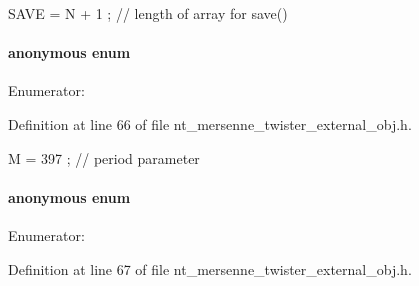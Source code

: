 \begin{DoxyCode}
{ SAVE = N + 1 };         // length of array for save()
\end{DoxyCode}


\paragraph[{"@2}]{\setlength{\rightskip}{0pt plus 5cm}anonymous enum}\hfill\label{class_m_t_rand_a10c3437be98225f5b0beee1ed8c033c8}
\begin{Desc}
\item[Enumerator: ]\par
\begin{description}
\item[{\em 
M\label{class_m_t_rand_a10c3437be98225f5b0beee1ed8c033c8a133070000b798889cd75535ea0d5bb71}
}]\end{description}
\end{Desc}



Definition at line 66 of file nt\_\-mersenne\_\-twister\_\-external\_\-obj.h.




\begin{DoxyCode}
{ M = 397 };              // period parameter
\end{DoxyCode}


\paragraph[{"@3}]{\setlength{\rightskip}{0pt plus 5cm}anonymous enum}\hfill\label{class_m_t_rand_a60fd88469207f761aef84c3fc57c04a3}
\begin{Desc}
\item[Enumerator: ]\par
\begin{description}
\item[{\em 
MAGIC\label{class_m_t_rand_a60fd88469207f761aef84c3fc57c04a3a96b50a7ca844c42f49fc8aaeedebdc2a}
}]\end{description}
\end{Desc}



Definition at line 67 of file nt\_\-mersenne\_\-twister\_\-external\_\-obj.h.




